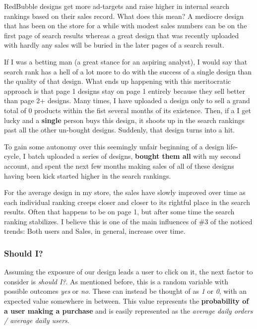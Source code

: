 \documentclass[]{article}
\begin{document}
RedBubble designs get more ad-targets and raise higher in internal
search rankings based on their sales record. What does this mean? A
mediocre design that has been on the store for a while with modest sales
numbers can be on the first page of search results whereas a great
design that was recently uploaded with hardly any sales will be buried
in the later pages of a search result.

If I was a betting man (a great stance for an aspiring analyst), I would
say that search rank has a hell of a lot more to do with the success of
a single design than the quality of that design. What ends up happening
with this meritocratic approach is that page 1 designs stay on page 1
entirely because they sell better than page 2+ designs. Many times, I
have uploaded a design only to sell a grand total of 0 products within
the fist several months of its existence. Then, if a I get lucky and a
\textbf{single} person buys this design, it shoots up in the search
rankings past all the other un-bought designs. Suddenly, that design
turns into a hit.

To gain some autonomy over this seemingly unfair beginning of a design
life-cycle, I batch uploaded a series of designs, \textbf{bought them
all} with my second account, and spent the next few months making sales
of all of these designs having been kick started higher in the search
rankings.

For the average design in my store, the sales have slowly improved over
time as each individual ranking creeps closer and closer to its rightful
place in the search results. Often that happens to be on page 1, but
after some time the search ranking stabilizes. I believe this is one of
the main influences of \#3 of the noticed trends: Both users and Sales,
in general, increase over time.

\subsubsection{Should I?}\label{should-i}

Assuming the exposure of our design leads a user to click on it, the
next factor to consider is \emph{should I?}. As mentioned before, this
is a random variable with possible outcomes \emph{yes} or \emph{no}.
These can instead be thought of as \emph{1} or \emph{0}, with an
expected value somewhere in between. This value represents the
\textbf{probability of a user making a purchase} and is easily
represented as the \emph{average daily orders / average daily users}.
\end{document}
